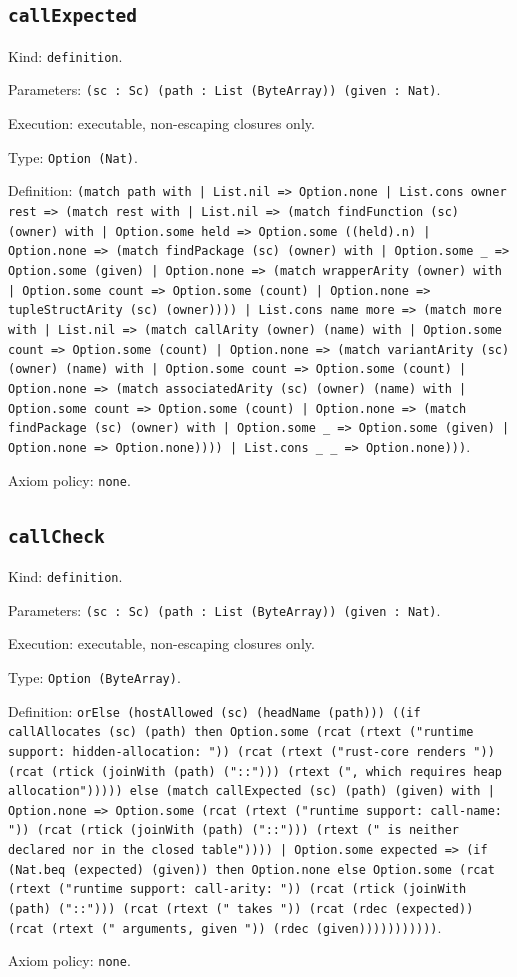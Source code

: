 \documentclass[11pt]{article}
\begin{document}
\subsection*{\texttt{callExpected}}
\noindent Kind: \texttt{definition}.\par
\noindent Parameters: \texttt{(sc : Sc) (path : List (ByteArray)) (given : Nat)}.\par
\noindent Execution: executable, non-escaping closures only.\par
\noindent Type: \texttt{Option (Nat)}.\par
\noindent Definition: \texttt{(match path with | List.nil => Option.none | List.cons owner rest => (match rest with | List.nil => (match findFunction (sc) (owner) with | Option.some held => Option.some ((held).n) | Option.none => (match findPackage (sc) (owner) with | Option.some \_ => Option.some (given) | Option.none => (match wrapperArity (owner) with | Option.some count => Option.some (count) | Option.none => tupleStructArity (sc) (owner)))) | List.cons name more => (match more with | List.nil => (match callArity (owner) (name) with | Option.some count => Option.some (count) | Option.none => (match variantArity (sc) (owner) (name) with | Option.some count => Option.some (count) | Option.none => (match associatedArity (sc) (owner) (name) with | Option.some count => Option.some (count) | Option.none => (match findPackage (sc) (owner) with | Option.some \_ => Option.some (given) | Option.none => Option.none)))) | List.cons \_ \_ => Option.none)))}.\par
\noindent Axiom policy: \texttt{none}.\par
\subsection*{\texttt{callCheck}}
\noindent Kind: \texttt{definition}.\par
\noindent Parameters: \texttt{(sc : Sc) (path : List (ByteArray)) (given : Nat)}.\par
\noindent Execution: executable, non-escaping closures only.\par
\noindent Type: \texttt{Option (ByteArray)}.\par
\noindent Definition: \texttt{orElse (hostAllowed (sc) (headName (path))) ((if callAllocates (sc) (path) then Option.some (rcat (rtext ("runtime support: hidden-allocation: ")) (rcat (rtext ("rust-core renders ")) (rcat (rtick (joinWith (path) ("::"))) (rtext (", which requires heap allocation"))))) else (match callExpected (sc) (path) (given) with | Option.none => Option.some (rcat (rtext ("runtime support: call-name: ")) (rcat (rtick (joinWith (path) ("::"))) (rtext (" is neither declared nor in the closed table")))) | Option.some expected => (if (Nat.beq (expected) (given)) then Option.none else Option.some (rcat (rtext ("runtime support: call-arity: ")) (rcat (rtick (joinWith (path) ("::"))) (rcat (rtext (" takes ")) (rcat (rdec (expected)) (rcat (rtext (" arguments, given ")) (rdec (given)))))))))))}.\par
\noindent Axiom policy: \texttt{none}.\par
\end{document}
